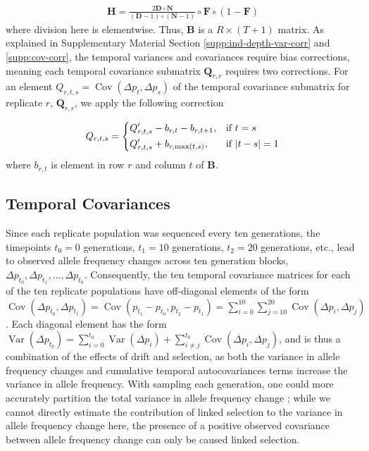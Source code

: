\documentclass[11pt]{article}
\DeclareMathOperator{\var}{Var}
\DeclareMathOperator{\cov}{Cov}
\begin{document}
\begin{align}
  \mathbf{H} = \frac{2 \mathbf{D} \circ \mathbf{N} }{ (\mathbf{D}-1) \circ (\mathbf{N} -1)} \circ \mathbf{F} \circ (1-\mathbf{F})
\end{align}
%
where division here is elementwise. Thus, $\mathbf{B}$ is a $R \times (T+1)$
matrix. As explained in Supplementary Material Section
\ref{supp:ind-depth-var-corr} and \ref{supp:cov-corr}, the temporal variances
and covariances require bias corrections, meaning each temporal covariance
submatrix $\mathbf{Q}_{r,r}$ requires two corrections. For an element
$Q_{r,t,s} = \cov(\Delta p_t, \Delta p_s)$ of the temporal covariance submatrix
for replicate $r$, $\mathbf{Q}_{r,r}$, we apply the following correction

\begin{equation}
	Q_{r,t,s} =  
		\begin{dcases}
			Q_{r,t,s}' - b_{r,t} - b_{r,t+1}, & \text{if  } t = s \\
      Q_{r,t,s}' + b_{r,\max(t,s)}, & \text{if  } |t - s| = 1 \\
		\end{dcases}
\end{equation}
%
where $b_{r,t}$ is element in row $r$ and column $t$ of $\mathbf{B}$.


\subsection{\textcite{Barghi2019-qy} Temporal Covariances}
\label{supp:barghi-covs}

Since each replicate population was sequenced every ten generations,
the timepoints $t_0 = 0$ generations, $t_1 = 10$ generations, $t_2 = 20$
generations, etc., lead to observed allele frequency changes across ten
generation blocks, $\Delta p_{t_0}, \Delta p_{t_1}, \ldots, \Delta p_{t_6}$.
Consequently, the ten temporal covariance matrices for each of the ten
replicate populations have off-diagonal elements of the form $\cov(\Delta
p_{t_0}, \Delta p_{t_1}) = \cov(p_{t_1} - p_{t_0}, p_{t_2} - p_{t_1}) =
\sum_{i=0}^{10} \sum_{j=10}^{20} \cov(\Delta p_i, \Delta p_j)$. Each diagonal
element has the form $\var(\Delta p_{t_0}) = \sum_{i=0}^{t_0} \var(\Delta
p_{i}) + \sum_{i \ne j}^{t_0} \cov(\Delta p_{i}, \Delta p_{j})$, and is thus a
combination of the effects of drift and selection, as both the variance in
allele frequency changes and cumulative temporal autocovariances terms increase
the variance in allele frequency. With sampling each generation, one could more
accurately partition the total variance in allele frequency change
\parencite{Buffalo2019-io}; while we cannot directly estimate the contribution
of linked selection to the variance in allele frequency change here, the
presence of a positive observed covariance between allele frequency change can
only be caused linked selection. 
\end{document}
